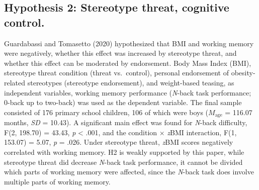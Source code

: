 \documentclass[
  stu, a4paper, 12pt,mask,floatsintext]{apa7}
\begin{document}
\subsection{Hypothesis 2: Stereotype threat, cognitive control.}\label{hypothesis-2-stereotype-threat-cognitive-control.}

Guardabassi and Tomasetto (2020) hypothesized that BMI and working memory were negatively, whether this effect was increased by stereotype threat, and whether this effect can be moderated by endorsement.
Body Mass Index (BMI), stereotype threat condition (threat vs.~control), personal endorsement of obesity-related stereotypes (stereotype endorsement), and weight-based teasing, as independent variables, working memory performance (\emph{N}-back task performance; 0-back up to two-back) was used as the dependent variable.
The final sample consisted of 176 primary school children, 106 of which were boys (\(M_{\text{age}}\) = 116.07 months, \emph{SD} = 10.43).
A significant main effect was found for \emph{N}-back difficulty, F(2, 198.70) = 43.43, \emph{p} \textless{} .001, and the condition \(\times\) \emph{z}BMI interaction, F(1, 153.07) = 5.07, \emph{p} = .026.
Under stereotype threat, \emph{z}BMI scores negatively correlated with working memory.
H2 is weakly supported by this paper, while stereotype threat did decrease \emph{N}-back task performance, it cannot be divided which parts of working memory were affected, since the \emph{N}-back task does involve multiple parts of working memory.
\end{document}

